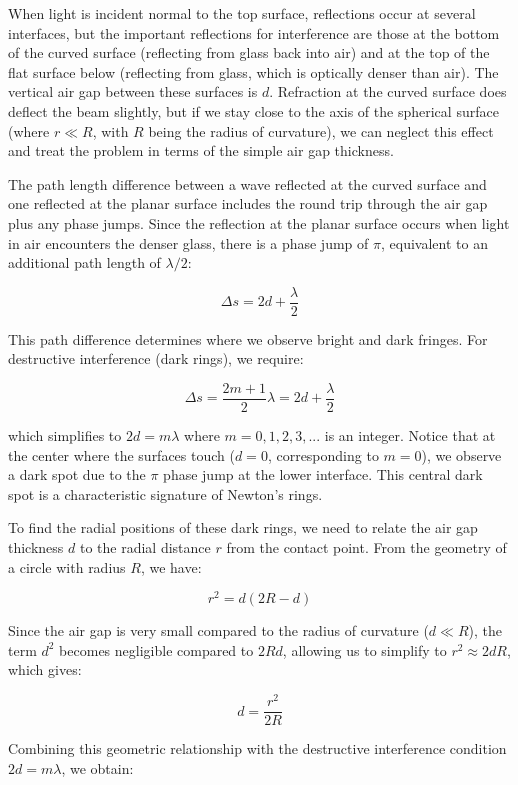 \documentclass[
  a4paper,
]{book}
\begin{document}
When light is incident normal to the top surface, reflections occur at
several interfaces, but the important reflections for interference are
those at the bottom of the curved surface (reflecting from glass back
into air) and at the top of the flat surface below (reflecting from
glass, which is optically denser than air). The vertical air gap between
these surfaces is \(d\). Refraction at the curved surface does deflect
the beam slightly, but if we stay close to the axis of the spherical
surface (where \(r \ll R\), with \(R\) being the radius of curvature),
we can neglect this effect and treat the problem in terms of the simple
air gap thickness.

The path length difference between a wave reflected at the curved
surface and one reflected at the planar surface includes the round trip
through the air gap plus any phase jumps. Since the reflection at the
planar surface occurs when light in air encounters the denser glass,
there is a phase jump of \(\pi\), equivalent to an additional path
length of \(\lambda/2\):

\[
\Delta s=2d+\frac{\lambda}{2}
\]

This path difference determines where we observe bright and dark
fringes. For destructive interference (dark rings), we require:

\[
\Delta s=\frac{2m+1}{2}\lambda=2d+\frac{\lambda}{2}
\]

which simplifies to \(2d = m\lambda\) where \(m = 0, 1, 2, 3, ...\) is
an integer. Notice that at the center where the surfaces touch
(\(d = 0\), corresponding to \(m = 0\)), we observe a dark spot due to
the \(\pi\) phase jump at the lower interface. This central dark spot is
a characteristic signature of Newton's rings.

To find the radial positions of these dark rings, we need to relate the
air gap thickness \(d\) to the radial distance \(r\) from the contact
point. From the geometry of a circle with radius \(R\), we have:

\[
r^2=d(2R-d)
\]

Since the air gap is very small compared to the radius of curvature
(\(d \ll R\)), the term \(d^2\) becomes negligible compared to \(2Rd\),
allowing us to simplify to \(r^2 \approx 2dR\), which gives:

\[
d=\frac{r^2}{2R}
\]

Combining this geometric relationship with the destructive interference
condition \(2d = m\lambda\), we obtain:
\end{document}

